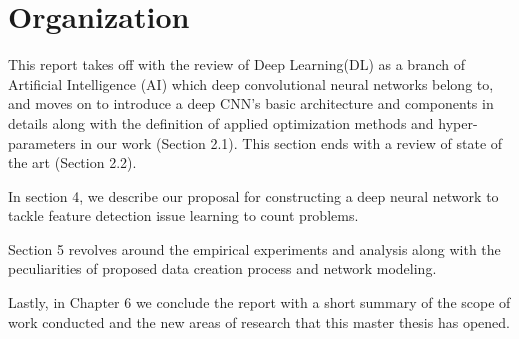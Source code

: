 \section{Organization}

This report takes off with the review of Deep Learning(DL) as a branch of Artificial Intelligence (AI) which deep convolutional neural networks belong to, and moves on to introduce a deep CNN's basic architecture and components in details along with the definition of applied optimization methods and hyper-parameters in our work (Section 2.1). This section ends with a review of state of the art (Section 2.2). 

In section 4, we describe our proposal for constructing a deep neural network to tackle feature detection issue learning to count problems. 

Section 5 revolves around the empirical experiments and analysis along with the peculiarities of proposed data creation process and network modeling.  

Lastly, in Chapter 6 we conclude the report with a short summary of the scope of work conducted and the new areas of research that this master thesis has opened.